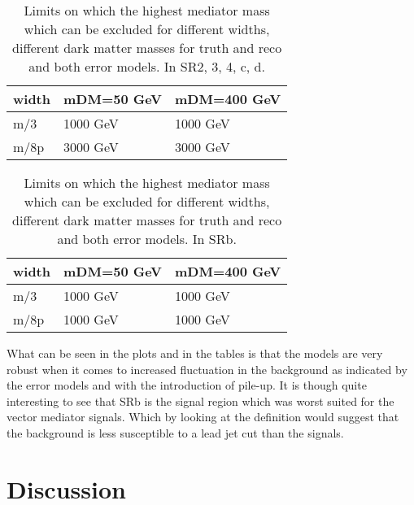 \begin{table}[ht]
\begin{center}
\begin{tabular}{|l|l|l|}
\hline
width & mDM=50 GeV & mDM=400 GeV \\ \hline
m/3 & 1000 GeV & 1000 GeV \\ \hline
m/8p & 3000 GeV & 3000 GeV\\ \hline
\end{tabular}
\caption{Limits on which the highest mediator mass which can be excluded for different widths, different dark matter masses for truth and reco and both error models. In SR2, 3, 4, c, d.}
\label{tab:mediatorpass}
\end{center}
\end{table}
\begin{table}[ht]
\begin{center}
\begin{tabular}{|l|l|l|}
\hline
width & mDM=50 GeV & mDM=400 GeV \\ \hline
m/3 & 1000 GeV & 1000 GeV\\ \hline
m/8p & 1000 GeV & 1000 GeV\\ \hline
\end{tabular}
\caption{Limits on which the highest mediator mass which can be excluded for different widths, different dark matter masses for truth and reco and both error models. In SRb.}
\label{tab:mediatorpass2}
\end{center}
\end{table}

What can be seen in the plots and in the tables is that the models are very robust when it comes to increased fluctuation in the background as indicated by the error models and with the introduction of pile-up. It is though quite interesting to see that SRb is the signal region which was worst suited for the vector mediator signals. Which by looking at the definition would suggest that the background is less susceptible to a lead jet cut than the signals.

\newpage
\section{Discussion}
